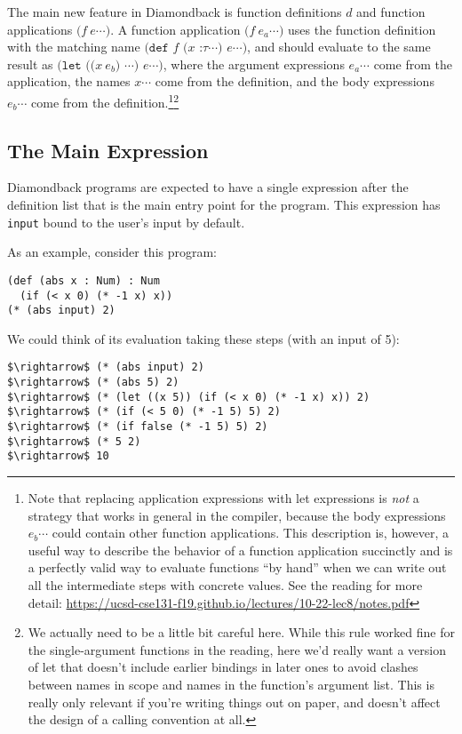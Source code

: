 \documentclass[10pt, oneside]{article}
\begin{document}
The main new feature in Diamondback is function definitions $d$ and function
applications $\texttt{($f\ e\cdots$)}$. A function application $\texttt{($f\
e_a\cdots$)}$ uses the function definition with the matching name
$\texttt{(def $f$ ($x$ :$\tau \cdots$) $e \cdots$)}$, and should evaluate to
the same result as $\texttt{(let (($x\ e_b$) $\cdots$) $e \cdots$)}$, where
the argument expressions $e_a\cdots$ come from the application, the names
$x\cdots$ come from the definition, and the body expressions $e_b\cdots$ come
from the definition.\footnote{Note that replacing application expressions
with let expressions is \emph{not} a strategy that works in general in the
compiler, because the body expressions $e_b\cdots$ could contain other
function applications. This description is, however, a useful way to describe
the behavior of a function application succinctly and is a perfectly valid
way to evaluate functions ``by hand'' when we can write out all the
intermediate steps with concrete values. See the reading for more detail:
\url{https://ucsd-cse131-f19.github.io/lectures/10-22-lec8/notes.pdf}}\footnote{We
actually need to be a little bit careful here. While this rule worked fine
for the single-argument functions in the reading, here we'd really want a
version of let that doesn't include earlier bindings in later ones to avoid
clashes between names in scope and names in the function's argument list.
This is really only relevant if you're writing things out on paper, and
doesn't affect the design of a calling convention at all.}

\subsection*{The Main Expression}

Diamondback programs are expected to have a single expression after the
definition list that is the main entry point for the program. This expression
has {\tt input} bound to the user's input by default.

As an example, consider this program:

\begin{lstlisting}
(def (abs x : Num) : Num
  (if (< x 0) (* -1 x) x))
(* (abs input) 2)
\end{lstlisting}

We could think of its evaluation taking these steps (with an input of 5):

\begin{lstlisting}
$\rightarrow$ (* (abs input) 2)
$\rightarrow$ (* (abs 5) 2)
$\rightarrow$ (* (let ((x 5)) (if (< x 0) (* -1 x) x)) 2)
$\rightarrow$ (* (if (< 5 0) (* -1 5) 5) 2)
$\rightarrow$ (* (if false (* -1 5) 5) 2)
$\rightarrow$ (* 5 2)
$\rightarrow$ 10
\end{lstlisting}
\end{document}
